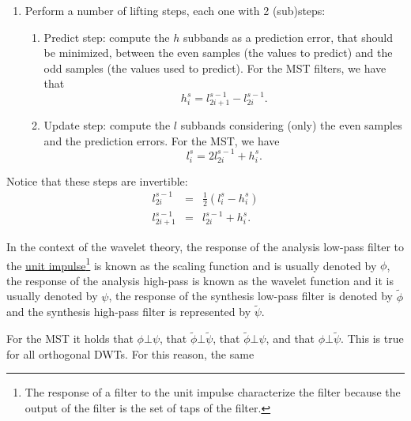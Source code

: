 \begin{enumerate}
\item Perform a number of lifting steps, each one with 2 (sub)steps:
  \begin{enumerate}
  \item Predict step: compute the $h$ subbands as a prediction error,
    that should be minimized, between the even samples (the values to
    predict) and the odd samples (the values used to predict). For the
    MST filters, we have that
    \begin{equation}
      h^s_i = l^{s-1}_{2i+1} - l^{s-1}_{2i}.
    \end{equation}
    
  \item Update step: compute the $l$ subbands considering (only) the even
    samples and the prediction errors. For the MST, we have
    \begin{equation}
      l^s_i = 2l^{s-1}_{2i} + h^s_i.
    \end{equation}
  \end{enumerate}
\end{enumerate}

Notice that these steps are invertible:
\begin{equation}
  \begin{array}{rcl}
    l^{s-1}_{2i} & = & \frac{1}{2}(l^s_i - h^s_i)\\
    l^{s-1}_{2i+1} & = & l^{s-1}_{2i} + h^s_i.
  \end{array}
\end{equation}

In the context of the wavelet theory, the response of the analysis
low-pass filter to the
\href{https://en.wikipedia.org/?title=Unit_impulse&redirect=no}{unit
  impulse}\footnote{The response of a filter to the unit impulse
  characterize the filter because the output of the filter is the set
  of taps of the filter.} is known as the scaling function and is
usually denoted by $\phi$, the response of the analysis high-pass is
known as the wavelet function and it is usually denoted by $\psi$, the
response of the synthesis low-pass filter is denoted by $\tilde\phi$
and the synthesis high-pass filter is represented by $\tilde\psi$.

For the MST it holds that $\phi\bot\psi$, that
$\tilde\phi\bot\tilde\psi$, that $\tilde\phi\bot\psi$, and that
$\phi\bot\tilde\psi$. This is true for all orthogonal DWTs. For this reason, the same 

